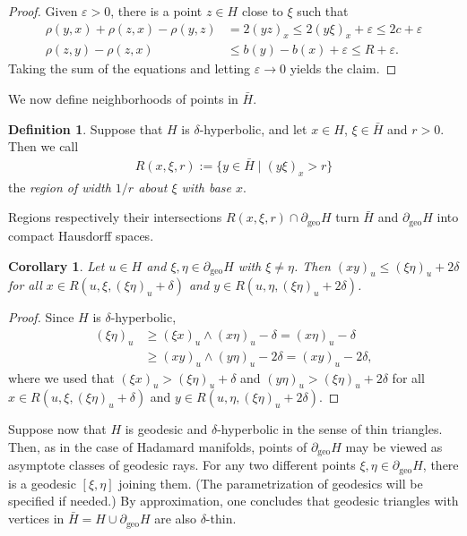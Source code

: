 \documentclass[12pt,a4paper]{amsart}
\numberwithin{equation}{section}
\newtheorem{cor}[equation]{Corollary}
\theoremstyle{definition}
\newtheorem{dfn}[equation]{Definition}
\DeclareMathOperator{\geo}{geo}
\def\ve{\varepsilon}
\begin{document}
\begin{proof}
Given $\ve>0$, there is a point $z\in H$ close to $\xi$ such that
\begin{align*}
    \rho(y,x)+\rho(z,x)-\rho(y,z) &= 2(yz)_x \le 2(y\xi)_x + \ve \le 2c + \ve \\
    \rho(z,y)-\rho(z,x) &\le b(y)-b(x) + \ve \le R + \ve.
\end{align*}
Taking the sum of the equations and letting $\ve\to0$ yields the claim.
\end{proof}

We now define neighborhoods of points in $\bar H$.

\begin{dfn}\label{deftas}
Suppose that $H$ is $\delta$-hyperbolic, and let $x\in H$, $\xi\in\bar H$ and $r>0$.
Then we call
\begin{align*}
    R(x,\xi,r) := \{y\in \bar H \mid (y\xi)_x > r \}
\end{align*}
the \emph{region of width $1/r$ about $\xi$ with base $x$}.
\end{dfn}

Regions respectively their intersections $R(x,\xi,r)\cap\partial_{\geo}H$ turn $\bar H$ and $\partial_{\geo}H$ into compact Hausdorff spaces.

\begin{cor}\label{triest2}
Let $u\in H$ and $\xi,\eta\in\partial_{\geo}H$ with $\xi\ne\eta$.
Then $(xy)_u\leq(\xi\eta)_u+2\delta$ for all $x\in R(u,\xi,(\xi\eta)_u+\delta)$ and $y\in R(u,\eta,(\xi\eta)_u+2\delta)$.
\end{cor}

\begin{proof}
Since $H$ is $\delta$-hyperbolic,
\begin{align*}
    (\xi\eta)_u &\ge (\xi x)_u\wedge(x\eta)_u - \delta
    = (x\eta)_u - \delta \\         
    &\ge (xy)_u\wedge(y\eta)_u - 2\delta
    = (xy)_u -2\delta,
\end{align*}
where we used that $(\xi x)_u>(\xi\eta)_u+\delta$ and $(y\eta)_u>(\xi\eta)_u+2\delta$
for all $x\in R(u,\xi,(\xi\eta)_u+\delta)$ and $y\in R(u,\eta,(\xi\eta)_u+2\delta)$.
\end{proof}

Suppose now that $H$ is geodesic and $\delta$-hyperbolic in the sense of thin triangles.
Then, as in the case of Hadamard manifolds, points of $\partial_{\geo}H$ may be viewed as asymptote classes of geodesic rays.
For any two different points $\xi,\eta\in\partial_{\geo}H$, there is a geodesic $[\xi,\eta]$ joining them.
(The parametrization of geodesics will be specified if needed.)
By approximation, one concludes that geodesic triangles with vertices in $\bar H=H\cup \partial_{\geo}H$ are also $\delta$-thin.
\end{document}
